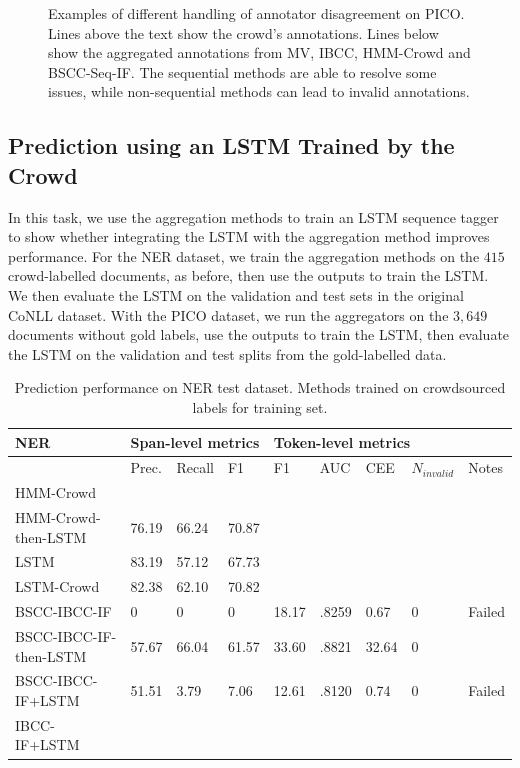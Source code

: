 \begin{figure}
{}
\caption{Examples of different handling of annotator disagreement on PICO. 
Lines above the text show the crowd's annotations. Lines below show the aggregated annotations from MV, IBCC, HMM-Crowd and BSCC-Seq-IF.
The sequential methods are able to resolve some issues, 
while non-sequential methods can lead to invalid annotations. }
\label{fig:disagreements}
\end{figure}

\subsection{Prediction using an LSTM Trained by the Crowd}\label{sec:task2}

In this task, we use the aggregation methods to train an LSTM sequence tagger \cite{lample2016}
to show whether integrating the LSTM with the aggregation method improves performance.
For the NER dataset, we train the aggregation methods on the $415$ crowd-labelled documents, as before,
then use the outputs to train the LSTM. We then evaluate the LSTM on the validation and test sets
in the original CoNLL dataset.
With the PICO dataset, we run the aggregators on the $3,649$ documents without gold labels, 
use the outputs to train the LSTM, then evaluate the LSTM on the validation and test splits from the gold-labelled data.


\begin{table}
\begin{tabularx}{\textwidth}{| l | X | X | X | X | X | X | X | X |}
\hline
NER & \multicolumn{3}{|l|}{Span-level metrics}                     & \multicolumn{4}{|l|}{Token-level metrics} \\ \hline 
& Prec. & Recall & F1 & F1 & AUC & CEE & $N_{invalid}$ & Notes  \\ \hline
HMM-Crowd &  \\ 
HMM-Crowd-then-LSTM & 76.19 & 66.24 & 70.87 &\\ 
LSTM & 83.19 & 57.12 & 67.73 \\ 
LSTM-Crowd & 82.38 & 62.10 & 70.82 \\ \hline
BSCC-IBCC-IF & 0 & 0 & 0 & 18.17 & .8259 & 0.67 & 0 & Failed \\ \hline
BSCC-IBCC-IF-then-LSTM & 57.67 & 66.04 & 61.57 & 33.60 & .8821 & 32.64 & 0 \\
BSCC-IBCC-IF+LSTM & 51.51 & 3.79 & 7.06 & 12.61 & .8120 & 0.74 & 0 & Failed \\
IBCC-IF+LSTM &\\
\hline
\end{tabularx}
\caption{Prediction performance on NER test dataset. Methods trained on crowdsourced labels for training set.}
\label{tab:prediction_results_ner}
\end{table}

